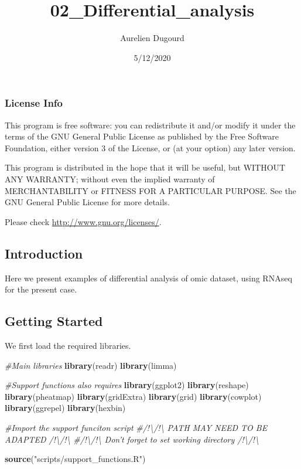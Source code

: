 \documentclass[]{article}
\title{02\_Differential\_analysis}
\author{Aurelien Dugourd}
\date{5/12/2020}
\newenvironment{Shaded}{\begin{snugshade}}{\end{snugshade}}
\newcommand{\CommentTok}[1]{\textcolor[rgb]{0.56,0.35,0.01}{\textit{#1}}}
\newcommand{\KeywordTok}[1]{\textcolor[rgb]{0.13,0.29,0.53}{\textbf{#1}}}
\newcommand{\NormalTok}[1]{#1}
\newcommand{\StringTok}[1]{\textcolor[rgb]{0.31,0.60,0.02}{#1}}
\begin{document}
\maketitle

\hypertarget{license-info}{%
\subsubsection{License Info}\label{license-info}}

This program is free software: you can redistribute it and/or modify it
under the terms of the GNU General Public License as published by the
Free Software Foundation, either version 3 of the License, or (at your
option) any later version.

This program is distributed in the hope that it will be useful, but
WITHOUT ANY WARRANTY; without even the implied warranty of
MERCHANTABILITY or FITNESS FOR A PARTICULAR PURPOSE. See the GNU General
Public License for more details.

Please check \url{http://www.gnu.org/licenses/}.

\hypertarget{introduction}{%
\subsection{Introduction}\label{introduction}}

Here we present examples of differential analysis of omic dataset, using
RNAseq for the present case.

\hypertarget{getting-started}{%
\subsection{Getting Started}\label{getting-started}}

We first load the required libraries.

\begin{Shaded}
\begin{Highlighting}[]
\CommentTok{#Main libraries}
\KeywordTok{library}\NormalTok{(readr)}
\KeywordTok{library}\NormalTok{(limma)}

\CommentTok{#Support functions also requires}
\KeywordTok{library}\NormalTok{(ggplot2)}
\KeywordTok{library}\NormalTok{(reshape)}
\KeywordTok{library}\NormalTok{(pheatmap)}
\KeywordTok{library}\NormalTok{(gridExtra)}
\KeywordTok{library}\NormalTok{(grid)}
\KeywordTok{library}\NormalTok{(cowplot)}
\KeywordTok{library}\NormalTok{(ggrepel)}
\KeywordTok{library}\NormalTok{(hexbin)}

\CommentTok{#Import the support funciton script }
\CommentTok{#/!\textbackslash{}/!\textbackslash{} PATH MAY NEED TO BE ADAPTED /!\textbackslash{}/!\textbackslash{}}
\CommentTok{#/!\textbackslash{}/!\textbackslash{} Don't forget to set working directory /!\textbackslash{}/!\textbackslash{}}

\KeywordTok{source}\NormalTok{(}\StringTok{"scripts/support_functions.R"}\NormalTok{)}
\end{Highlighting}
\end{Shaded}
\end{document}
